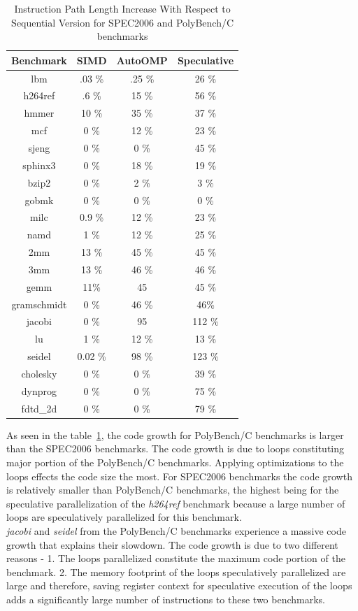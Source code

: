 \documentclass[10pt]{report}          %
\begin{document}
\begin{table}[h]
\centering
\caption{Instruction Path Length Increase With Respect to Sequential Version for SPEC2006 and PolyBench/C benchmarks}
\begin{tabular}{|c||c|c|c|} \hline
Benchmark & SIMD & AutoOMP & Speculative\\ \hline 
lbm & .03 \% & .25 \% & 26 \%\\ \hline
h264ref & .6 \% & 15 \% & 56 \% \\ \hline
hmmer  & 10 \% & 35 \% & 37 \%  \\ \hline
mcf  & 0 \% & 12 \% & 23 \% \\ \hline
sjeng  & 0 \% & 0 \% & 45 \%  \\ \hline
sphinx3  & 0 \% & 18 \% & 19 \%  \\ \hline
bzip2 & 0 \% & 2 \% & 3 \%  \\ \hline
gobmk  & 0 \% & 0 \% & 0 \%  \\ \hline
milc  & 0.9 \% & 12 \% & 23 \%  \\ \hline
namd & 1 \% & 12 \% & 25 \%  \\ \hline
2mm	& 13 \% & 45 \% & 45 \% \\ \hline
3mm	 & 13 \% & 46 \% & 46 \% \\ \hline
gemm	  & 11\% & 45 & 45 \% \\ \hline
gramschmidt	 & 0 \% & 46 \% & 46\% \\ \hline
jacobi & 0 \% & 95 & 112 \%  \\ \hline
lu	 & 1 \% & 12 \% & 13 \% \\ \hline
seidel&	 0.02 \% & 98 \% & 123 \% \\ \hline
cholesky  & 0 \% & 0 \% & 39 \%\\ \hline
dynprog& 0 \% & 0 \% & 75 \%\\ \hline
fdtd\_2d  & 0 \% & 0 \% & 79 \% \\ \hline
\hline\end{tabular}
\label{table:instruction_path}
\end{table}

As seen in the table~\ref{table:instruction_path}, the code growth for PolyBench/C benchmarks is larger than the SPEC2006 benchmarks.  The code growth is due to loops constituting major portion of the PolyBench/C benchmarks. Applying optimizations to the loops effects the code size the most.  For SPEC2006 benchmarks the code growth is relatively smaller than PolyBench/C benchmarks, the highest being for the speculative parallelization of the \textit{h264ref} benchmark because a large number of loops are speculatively parallelized for this benchmark. \\
\textit{jacobi} and \textit{seidel} from the PolyBench/C benchmarks experience a massive code growth that explains their slowdown.  The code growth is due to two different reasons - 1. The loops parallelized constitute the maximum code portion of the benchmark. 2. The memory footprint of the loops speculatively parallelized are large and therefore, saving register context for speculative execution of the loops adds a significantly large number of instructions to these two benchmarks.
\end{document}
